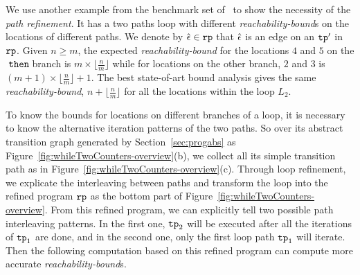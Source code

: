 We use another example from the benchmark set of~\cite{GulwaniJK09} to show the necessity of the \emph{path refinement}. It has a two paths loop
 with different \emph{reachability-bound}s on the locations of different paths.
 We denote by $\hat{\mathtt{\epsilon}{}} \in \mathtt{rp}$ that $\hat{\mathtt{\epsilon}{}}$ is an edge on  an $\mathtt{tp}'$ in $\mathtt{rp}$.
Given $n \geq m$,
the expected \emph{reachability-bound} for the locations $4$ and $5$ on the$\mathtt{\;then\;}$branch is $m \times \lfloor\frac{n}{m}\rfloor$
while for locations on the other branch, $2$ and $3$ is $(m + 1) \times \lfloor\frac{n}{m}\rfloor + 1$. 
The best state-of-art bound analysis
gives the same \emph{reachability-bound}, $n + \lfloor\frac{n}{m}\rfloor$ for all the locations within the loop $L_2$.

To know the bounds for locations on different branches of a loop, 
it is necessary to know the alternative iteration patterns of the two paths.
So over its abstract transition graph generated by Section~\ref{sec:progabs} as Figure~\ref{fig:whileTwoCounters-overview}(b), we collect all its simple transition path as in Figure~\ref{fig:whileTwoCounters-overview}(c).
Through loop refinement, we explicate the interleaving between paths and
transform the loop into the refined program $\mathtt{rp}$ as the bottom part of Figure~\ref{fig:whileTwoCounters-overview}.
From this refined program, we can explicitly tell two possible path interleaving patterns.
In the first one, $\mathtt{tp}_2$ will be executed after all the iterations of $\mathtt{tp}_1$ are done, and in the second one,
only the first loop path $\mathtt{tp}_1$ will iterate.
Then the following computation based on this refined program can compute more accurate \emph{reachability-bound}s.

